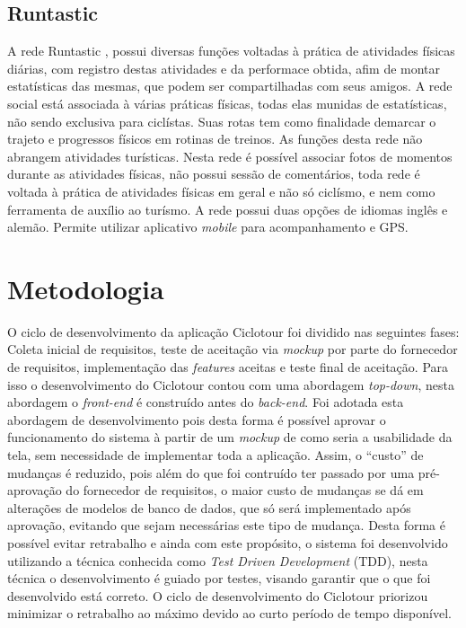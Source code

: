 \subsection{Runtastic}
A rede Runtastic \cite{runtastic}, possui diversas funções voltadas à prática de atividades físicas diárias, com registro destas atividades e da 
performace obtida, afim de montar estatísticas das mesmas, que podem ser compartilhadas com seus amigos. A rede social está associada à várias 
práticas físicas, todas elas munidas de estatísticas, não sendo exclusiva para ciclístas. Suas rotas tem como finalidade demarcar o trajeto e 
progressos físicos em rotinas de treinos. As funções desta rede não abrangem atividades turísticas. Nesta rede é possível associar fotos 
de momentos durante as atividades físicas, não possui sessão de comentários, toda rede é voltada à prática de atividades físicas em geral e não 
só ciclísmo, e nem como ferramenta de auxílio ao turísmo. A rede possui duas opções de idiomas inglês e alemão. Permite utilizar aplicativo 
\textit{mobile} para acompanhamento e GPS.

\section{Metodologia}
O ciclo de desenvolvimento da aplicação Ciclotour foi dividido nas seguintes fases: Coleta inicial de requisitos, teste de aceitação via 
\textit{mockup} por parte do fornecedor de requisitos, implementação das \textit{features} aceitas e teste final de aceitação. Para isso 
o desenvolvimento do Ciclotour contou com uma abordagem \textit{top-down}, nesta abordagem o \textit{front-end} é construído antes do 
\textit{back-end}. Foi adotada esta abordagem de desenvolvimento pois desta forma é possível aprovar o funcionamento do sistema à partir de um 
\textit{mockup} de como seria a usabilidade da tela, sem necessidade de implementar toda a aplicação. Assim, o ``custo'' de mudanças é reduzido, 
pois além do que foi contruído ter passado por uma pré-aprovação do fornecedor de requisitos, o maior custo de mudanças se dá em alterações de 
modelos de banco de dados, que só será implementado após aprovação, evitando que sejam necessárias este tipo de mudança. Desta forma é possível 
evitar retrabalho e ainda com este propósito, o sistema foi desenvolvido utilizando a técnica conhecida como \textit{Test Driven Development} (TDD), 
nesta técnica o desenvolvimento é guiado por testes, visando garantir que o que foi desenvolvido está correto. O ciclo de desenvolvimento do 
Ciclotour priorizou minimizar o retrabalho ao máximo devido ao curto período de tempo disponível.

